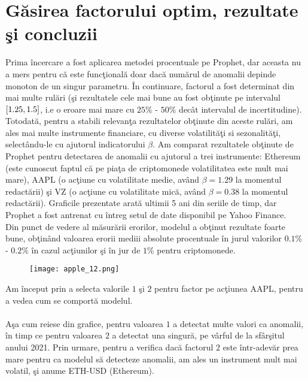 \section {G\u asirea factorului optim, rezultate \c si concluzii}

\noindent Prima \^ incercare a fost aplicarea metodei procentuale pe Prophet, dar aceasta nu a mers pentru c\u a este func\c tional\u a doar dac\u a num\u arul de anomalii depinde monoton de un singur parametru. \^ In continuare, factorul a fost determinat din mai multe rul\u ari (\c si rezultatele cele mai bune au fost ob\c tinute pe intervalul $\interval{1.25}{1.5}$, i.e o eroare mai mare cu $25\%$ - $50\%$ dec\^ at intervalul de incertitudine). \\

\noindent Totodat\u a, pentru a stabili relevan\c ta rezultatelor ob\c tinute din aceste rul\u ari, am ales mai multe instrumente financiare, cu diverse volatilit\u a\c ti si sezonalit\u a\c ti, select\^ andu-le cu ajutorul indicatorului $\beta$. Am comparat rezultatele ob\c tinute de Prophet pentru detectarea de anomalii cu ajutorul a trei instrumente: Ethereum (este cunoscut faptul c\u a pe pia\c ta de criptomonede volatilitatea este mult mai mare), AAPL (o ac\c tiune cu volatilitate medie, av\^ and $\beta = 1.29$ la momentul redact\u arii) \c si VZ (o ac\c tiune cu volatilitate mic\u a, av\^ and $\beta = 0.38$ la momentul redact\u arii). Graficile prezentate arat\u a ultimii 5 ani din seriile de timp, dar Prophet a fost antrenat cu \^ intreg setul de date disponibil pe Yahoo Finance. \\

\noindent Din punct de vedere al m\u asur\u arii erorilor, modelul a ob\c tinut rezultate foarte bune, ob\c tin\^ and valoarea erorii mediii absolute procentuale \^ in jurul valorilor $0.1\%$ - $0.2\%$ \^ in cazul ac\c tiunilor \c si \^ in jur de $1\%$ pentru criptomonede. 

\begin{wrapfigure}[16]{r}{0.5\textwidth}
    \texttt{[image: apple\_12.png]}
\end{wrapfigure}

\hfill \break 

\noindent Am \^ inceput prin a selecta valorile $1$ \c si $2$ pentru factor pe ac\c tiunea AAPL, pentru a vedea cum se comport\u a modelul. \\ \\ A\c sa cum reiese din grafice, pentru valoarea $1$ a detectat multe valori ca anomalii, \^ in timp ce pentru valoarea $2$ a detectat una singur\u a, pe v\^ arful de la sf\^ ar\c situl anului 2021. Prin urmare, pentru a verifica dac\u a factorul $2$ este \^ intr-adev\u ar prea mare pentru ca modelul s\u a detecteze anomalii, am ales un instrument mult mai volatil, \c si anume ETH-USD (Ethereum).

